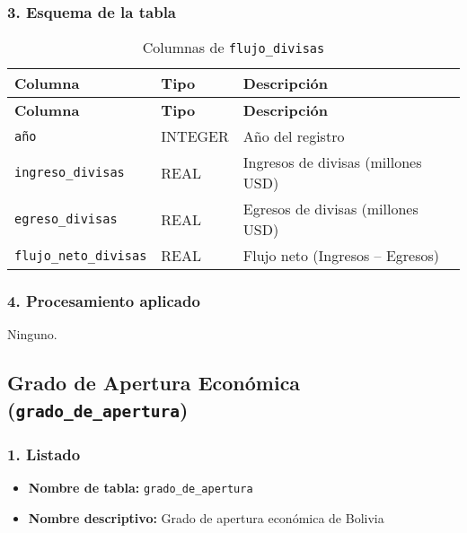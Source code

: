 \documentclass[12pt,a4paper]{article}
\begin{document}
\subsubsection*{3. Esquema de la tabla}
\begin{longtable}{@{}lll@{}}
\caption{Columnas de \texttt{flujo\_divisas}}\\
\toprule
\textbf{Columna}         & \textbf{Tipo} & \textbf{Descripción} \\
\midrule
\endfirsthead
\toprule
\textbf{Columna}         & \textbf{Tipo} & \textbf{Descripción} \\
\midrule
\endhead
\bottomrule
\endfoot
\texttt{año}               & INTEGER & Año del registro \\
\texttt{ingreso\_divisas}   & REAL    & Ingresos de divisas (millones USD) \\
\texttt{egreso\_divisas}    & REAL    & Egresos de divisas (millones USD) \\
\texttt{flujo\_neto\_divisas} & REAL    & Flujo neto (Ingresos – Egresos) \\
\end{longtable}

\subsubsection*{4. Procesamiento aplicado}
Ninguno.

\newpage
\subsection{Grado de Apertura Económica (\texttt{grado\_de\_apertura})}

\subsubsection*{1. Listado}
\begin{itemize}
  \item \textbf{Nombre de tabla:} \texttt{grado\_de\_apertura}
  \item \textbf{Nombre descriptivo:} Grado de apertura económica de Bolivia
\end{itemize}
\end{document}
